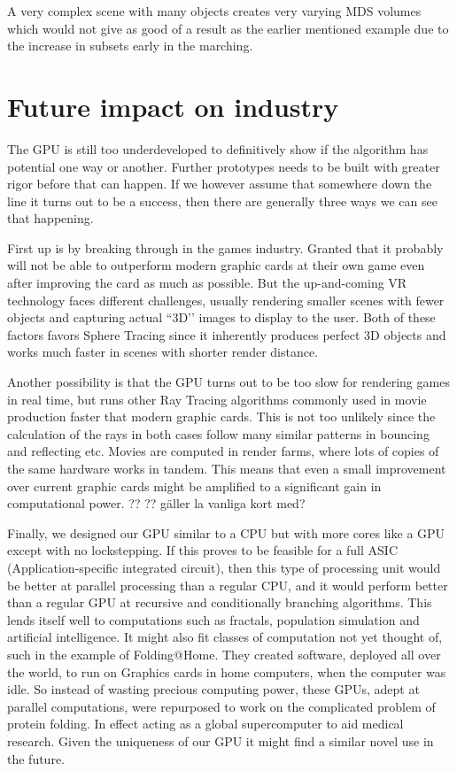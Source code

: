 			A very complex scene with many objects creates very varying MDS
			volumes which would not give as good of a result as the earlier
			mentioned example due to the increase in subsets early in the
			marching.

	\section{Future impact on industry} 

		The GPU is still too underdeveloped to definitively show if the
		algorithm has potential one way or another.  Further prototypes needs
		to be built with greater rigor before that can happen. If we however
		assume that somewhere down the line it turns out to be a success,
		then there are generally three ways we can see that happening.
		
		First up is by breaking through in the games industry. Granted that
		it probably will not be able to outperform modern graphic cards at
		their own game even after improving the card as much as possible. But
		the up-and-coming VR technology faces different challenges, usually
		rendering smaller scenes with fewer objects and capturing actual
		``3D’’ images to display to the user. Both of these factors favors
		Sphere Tracing since it inherently produces perfect 3D objects and
		works much faster in scenes with shorter render distance.
		
		Another possibility is that the GPU turns out to be too slow for
		rendering games in real time, but runs other Ray Tracing algorithms
		commonly used in movie production faster that modern graphic cards.
		This is not too unlikely since the calculation of the rays in both
		cases follow many similar patterns in bouncing and reflecting etc.
		Movies are computed in render farms, where lots of
		copies of the same hardware works in tandem. This means that even a
		small improvement over current graphic cards might be amplified to a
		significant gain in computational power.
		?? ?? gäller la vanliga kort med?
		
		Finally, we designed our GPU similar to a CPU but with more	cores
		like a GPU except with no lockstepping. If this proves to be feasible
		for a full ASIC (Application-specific integrated circuit), then this
		type of processing unit would be better at parallel processing than a
		regular CPU, and it would perform better than a regular GPU at
		recursive and conditionally branching algorithms. This lends itself
		well to computations such as fractals, population simulation and
		artificial intelligence. It might also fit classes of computation not
		yet thought of, such in the example of Folding@Home\cite{Beberg2009}.
		They created software, deployed all over the world, to run on
		Graphics cards in home computers, when the computer was idle. So
		instead of wasting precious computing power, these GPUs, adept at
		parallel computations, were repurposed to work on the complicated
		problem of protein folding. In effect acting as a global
		supercomputer to aid medical research. Given the uniqueness of our
		GPU it might find a similar novel use in the future.

